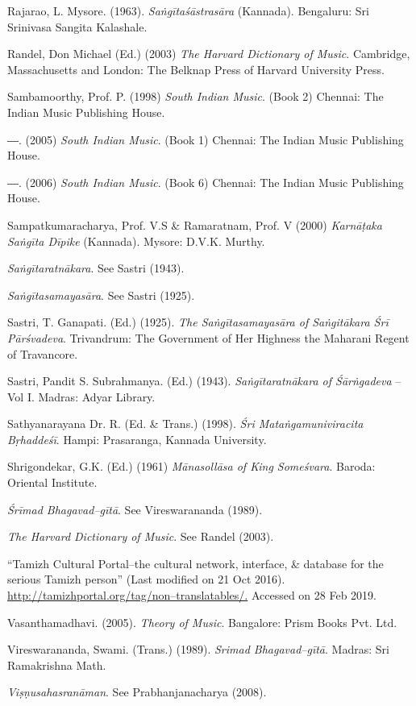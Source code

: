 \begin{thebibliography}{99}
  Rajarao, L. Mysore. (1963). \textit{Saṅgītaśāstrasāra} (Kannada). Bengaluru: Sri Srinivasa Sangita Kalashale.

  Randel, Don Michael (Ed.) (2003) \textit{The Harvard Dictionary of Music}. Cambridge, Massachusetts and London: The Belknap Press of Harvard University Press.

  Sambamoorthy, Prof. P. (1998) \textit{South Indian Music}. (Book 2) Chennai: The Indian Music Publishing House.

  ―. (2005) \textit{South Indian Music}. (Book 1) Chennai: The Indian Music Publishing House.

  ―. (2006) \textit{South Indian Music}. (Book 6) Chennai: The Indian Music Publishing House.

  Sampatkumaracharya, Prof. V.S \& Ramaratnam, Prof. V (2000) \textit{Karnāṭaka Saṅgīta Dīpike} (Kannada). Mysore: D.V.K. Murthy.

  \textit{Saṅgītaratnākara}. See Sastri (1943).

  \textit{Saṅgītasamayasāra}. See Sastri (1925).

  Sastri, T. Ganapati. (Ed.) (1925). \textit{The Saṅgītasamayasāra of Saṅgitākara Śrī Pārśvadeva}. Trivandrum: The Government of Her Highness the Maharani Regent of Travancore. 

  Sastri, Pandit S. Subrahmanya. (Ed.) (1943). \textit{Saṅgītaratnākara of Śārṅgadeva} – Vol I. Madras: Adyar Library.

  Sathyanarayana Dr. R. (Ed. \& Trans.) (1998). \textit{Śri Mataṅgamuniviracita Bṛhaddeśī}. Hampi: Prasaranga, Kannada University.

  Shrigondekar, G.K. (Ed.) (1961) \textit{Mānasollāsa of King Someśvara}. Baroda: Oriental Institute.

  \textit{Śrīmad Bhagavad–gītā}. See Vireswarananda (1989).

  \textit{The Harvard Dictionary of Music}. See Randel (2003).

  “Tamizh Cultural Portal–the cultural network, interface, \& database for the serious Tamizh person” (Last modified on 21 Oct 2016). \url{http://tamizhportal.org/tag/non–translatables/.} Accessed on 28 Feb 2019.

  Vasanthamadhavi. (2005). \textit{Theory of Music}. Bangalore: Prism Books Pvt. Ltd.

  Vireswarananda, Swami. (Trans.) (1989). \textit{Srimad Bhagavad–gītā}. Madras: Sri Ramakrishna Math.

  \textit{Viṣṇusahasranāman}. See Prabhanjanacharya (2008).

 \end{thebibliography}


